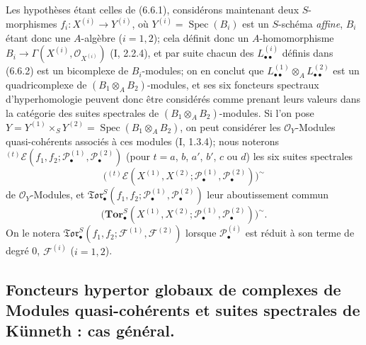 \begin{env}[6.6.8]
Les hypothèses étant celles de (6.6.1), considérons maintenant deux
$S$-morphismes $f_i:X^{(i)}\to Y^{(i)}$, où
$Y^{(i)}=\operatorname{Spec}(B_i)$ est un $S$-schéma \emph{affine}, $B_i$
étant donc une $A$-algèbre ($i=1,2$); cela définit donc un $A$-homomorphisme
$B_i\to\Gamma(X^{(i)},\mathscr O_{X^{(i)}})$ (I, 2.2.4), et par suite chacun
des $L_{\bullet\bullet}^{(i)}$ définis dans (6.6.2) est un bicomplexe de
$B_i$-modules; on en conclut que
$L_{\bullet\bullet}^{(1)}\otimes_A L_{\bullet\bullet}^{(2)}$ est un
quadricomplexe de $(B_1\otimes_A B_2)$-modules, et ses six foncteurs spectraux
d'hyperhomologie peuvent donc être considérés comme prenant leurs valeurs
dans la catégorie des suites spectrales de $(B_1\otimes_A B_2)$-modules. Si
l'on pose
$Y=Y^{(1)}\times_S Y^{(2)}=\operatorname{Spec}(B_1\otimes_A B_2)$, on peut
considérer les $\mathscr O_Y$-Modules quasi-cohérents associés à ces modules
(I, 1.3.4); nous noterons
${}^{(t)}\mathscr E
(f_1,f_2;\mathscr P_\bullet^{(1)},\mathscr P_\bullet^{(2)})$
(pour $t=a$, $b$, $a'$, $b'$, $c$ ou $d$) les six suites spectrales
\[
  \bigl({}^{(t)}\mathscr E
  (X^{(1)},X^{(2)};
   \mathscr P_\bullet^{(1)},\mathscr P_\bullet^{(2)})\bigr)^{\sim}
\]
de $\mathscr O_Y$-Modules, et
$\mathfrak{Tor}_\bullet^S
(f_1,f_2;\mathscr P_\bullet^{(1)},\mathscr P_\bullet^{(2)})$ leur
aboutissement commun
\[
  \bigl(\mathbf{Tor}_\bullet^S
  (X^{(1)},X^{(2)};
   \mathscr P_\bullet^{(1)},\mathscr P_\bullet^{(2)})\bigr)^{\sim}.
\]
On le notera
$\mathfrak{Tor}_\bullet^S(f_1,f_2;\mathscr F^{(1)},\mathscr F^{(2)})$
lorsque $\mathscr P_\bullet^{(i)}$ est réduit à son terme de degré 0,
$\mathscr F^{(i)}$ ($i=1,2$).
\end{env}

\subsection{Foncteurs hypertor globaux de complexes de Modules quasi-cohérents
et suites spectrales de Künneth : cas général.}

